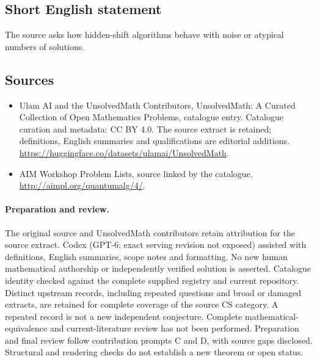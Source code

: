 \documentclass[11pt]{article}
\begin{document}
\subsection{Short English statement}
The source asks how hidden-shift algorithms behave with noise or atypical numbers of solutions.
\subsection{Sources}
\begin{itemize}
\item[\hypertarget{source:statement:1}{S1}] Ulam AI and the UnsolvedMath Contributors, UnsolvedMath: A Curated Collection of Open Mathematics Problems, catalogue entry. Catalogue curation and metadata: CC BY 4.0. The source extract is retained; definitions, English summaries and qualifications are editorial additions.
\url{https://huggingface.co/datasets/ulamai/UnsolvedMath}.
\item[\hypertarget{source:statement:2}{S2}] AIM Workshop Problem Lists, source linked by the catalogue.
\url{http://aimpl.org/quantumalg/4/}.
\end{itemize}
\paragraph{Preparation and review.}
The original source and UnsolvedMath contributors retain attribution for the source extract. Codex (GPT-6; exact serving revision not exposed) assisted with definitions, English summaries, scope notes and formatting. No new human mathematical authorship or independently verified solution is asserted. Catalogue identity checked against the complete supplied registry and current repository. Distinct upstream records, including repeated questions and broad or damaged extracts, are retained for complete coverage of the source CS category. A repeated record is not a new independent conjecture. Complete mathematical-equivalence and current-literature review has not been performed. Preparation and final review follow contribution prompts C and D, with source gaps disclosed. Structural and rendering checks do not establish a new theorem or open status.
\label{end:statement}
\end{document}
